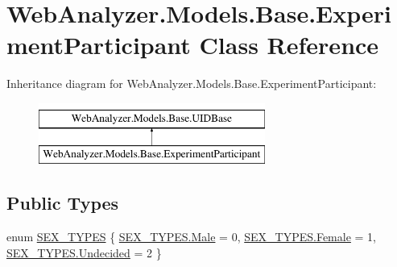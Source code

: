 \hypertarget{class_web_analyzer_1_1_models_1_1_base_1_1_experiment_participant}{}\section{Web\+Analyzer.\+Models.\+Base.\+Experiment\+Participant Class Reference}
\label{class_web_analyzer_1_1_models_1_1_base_1_1_experiment_participant}
Inheritance diagram for Web\+Analyzer.\+Models.\+Base.\+Experiment\+Participant\+:\begin{figure}[H]
\begin{center}
\leavevmode
\includegraphics[height=2.000000cm]{class_web_analyzer_1_1_models_1_1_base_1_1_experiment_participant}
\end{center}
\end{figure}
\subsection*{Public Types}
\begin{DoxyCompactItemize}
\item 
enum \hyperlink{class_web_analyzer_1_1_models_1_1_base_1_1_experiment_participant_a38a0a0bc1d3ad083204da1de1fb93754}{S\+E\+X\+\_\+\+T\+Y\+P\+E\+S} \{ \hyperlink{class_web_analyzer_1_1_models_1_1_base_1_1_experiment_participant_a38a0a0bc1d3ad083204da1de1fb93754a63889cfb9d3cbe05d1bd2be5cc9953fd}{S\+E\+X\+\_\+\+T\+Y\+P\+E\+S.\+Male} = 0, 
\hyperlink{class_web_analyzer_1_1_models_1_1_base_1_1_experiment_participant_a38a0a0bc1d3ad083204da1de1fb93754ab719ce180ec7bd9641fece2f920f4817}{S\+E\+X\+\_\+\+T\+Y\+P\+E\+S.\+Female} = 1, 
\hyperlink{class_web_analyzer_1_1_models_1_1_base_1_1_experiment_participant_a38a0a0bc1d3ad083204da1de1fb93754aef203c53904d46dbafaa94497dd5a0e2}{S\+E\+X\+\_\+\+T\+Y\+P\+E\+S.\+Undecided} = 2
 \}
\end{DoxyCompactItemize}
